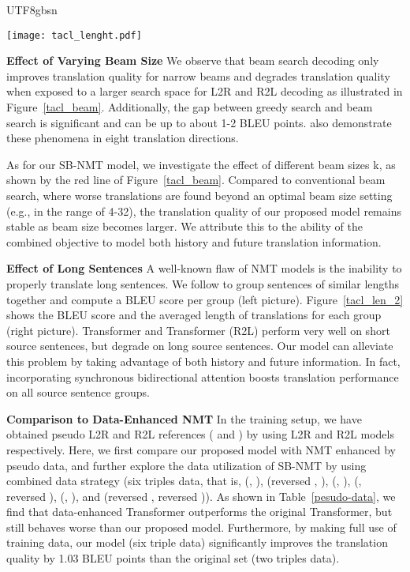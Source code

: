 \documentclass[11pt,a4paper]{article}
\begin{document}
\begin{CJK*}{UTF8}{gbsn}
\begin{figure*}
	\setlength{\abovecaptionskip}{0cm}
	\setlength{\belowcaptionskip}{-0.1cm}
	\centering
	\texttt{[image: tacl\_lenght.pdf]}
	\caption{Performance of translations on the test set with respect to the lengths of the source sentences.
	}\label{tacl_len_2}
\end{figure*}

\textbf{Effect of Varying Beam Size}
We observe that beam search decoding only improves translation quality for narrow beams and degrades translation quality when exposed to a larger search space for L2R and R2L decoding as illustrated in Figure~\ref{tacl_beam}. 
Additionally, the gap between greedy search and beam search is significant and can be up to about 1-2 BLEU points.
 also demonstrate these phenomena in eight translation directions.

As for our SB-NMT model, we investigate the effect of different beam sizes k, as shown by the red line of Figure~\ref{tacl_beam}. 
Compared to conventional beam search, where worse translations are found beyond an optimal beam size setting (e.g., in the range of 4-32), the translation quality of our proposed model remains stable as beam size becomes larger.
We attribute this to the ability of the combined objective to model both history and future translation information. 




\textbf{Effect of Long Sentences}
A well-known flaw of NMT models is the inability to properly translate long sentences.
We follow  to group sentences of similar lengths together and compute a BLEU score per group (left picture). Figure~\ref{tacl_len_2} shows the BLEU score and the averaged length of translations for each group (right picture).
Transformer and Transformer (R2L) perform very well on short source sentences, but degrade on long source sentences. 
Our model can alleviate this problem by taking advantage of both history and future information.
In fact, incorporating synchronous bidirectional attention boosts translation performance on all source sentence groups.

\textbf{Comparison to Data-Enhanced NMT}
In the training setup, we have obtained pseudo L2R and R2L references ( and ) by using L2R and R2L models respectively.
Here, we first compare our proposed model with NMT enhanced by pseudo data, and further explore the data utilization of SB-NMT by using combined data strategy (six triples data, that is, (, ), (reversed , ),
(, ), (, reversed ),
(, ), and (reversed , reversed )).
As shown in Table~\ref{pesudo-data}, we find that data-enhanced Transformer outperforms the original Transformer, but still behaves worse than our proposed model.
Furthermore, by making full use of training data, our model (six triple data) significantly improves the translation quality by 1.03 BLEU points than the original set (two triples data).



\end{CJK*}
\end{document}
